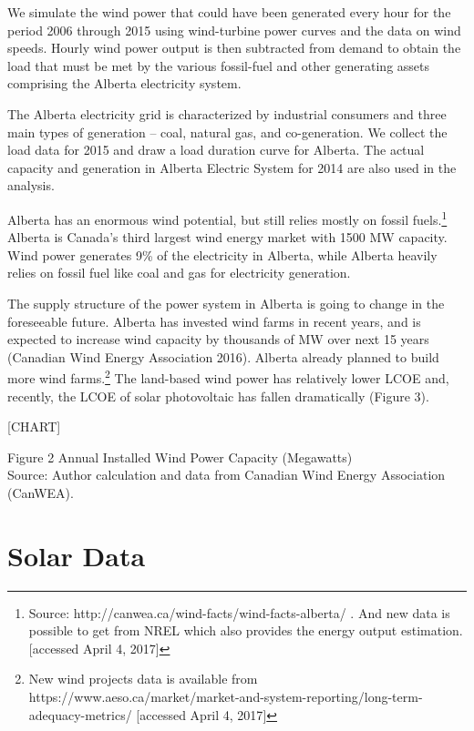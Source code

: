 We simulate the wind power that could have been generated every hour for
the period 2006 through 2015 using wind-turbine power curves and the
data on wind speeds. Hourly wind power output is then subtracted from
demand to obtain the load that must be met by the various fossil-fuel
and other generating assets comprising the Alberta electricity system.

The Alberta electricity grid is characterized by industrial consumers
and three main types of generation -- coal, natural gas, and
co-generation. We collect the load data for 2015 and draw a load
duration curve for Alberta. The actual capacity and generation in
Alberta Electric System for 2014 are also used in the analysis.

Alberta has an enormous wind potential, but still relies mostly on
fossil fuels.\footnote{Source:
	http://canwea.ca/wind-facts/wind-facts-alberta/ . And new data is
	possible to get from NREL which also provides the energy output
	estimation. {[}accessed April 4, 2017{]}} Alberta is Canada's third
largest wind energy market with 1500 MW capacity. Wind power generates
9\% of the electricity in Alberta, while Alberta heavily relies on
fossil fuel like coal and gas for electricity generation.

The supply structure of the power system in Alberta is going to change
in the foreseeable future. Alberta has invested wind farms in recent
years, and is expected to increase wind capacity by thousands of MW over
next 15 years (Canadian Wind Energy Association 2016). Alberta already
planned to build more wind farms.\footnote{New wind projects data is
	available from
	https://www.aeso.ca/market/market-and-system-reporting/long-term-adequacy-metrics/
	{[}accessed April 4, 2017{]}} The land-based wind power has relatively
lower LCOE and, recently, the LCOE of solar photovoltaic has fallen
dramatically (Figure 3).

{{[}CHART{]}}

Figure 2 Annual Installed Wind Power Capacity (Megawatts)\\
Source: Author calculation and data from Canadian Wind Energy
Association (CanWEA).

\section{Solar Data}\label{solar-data}

